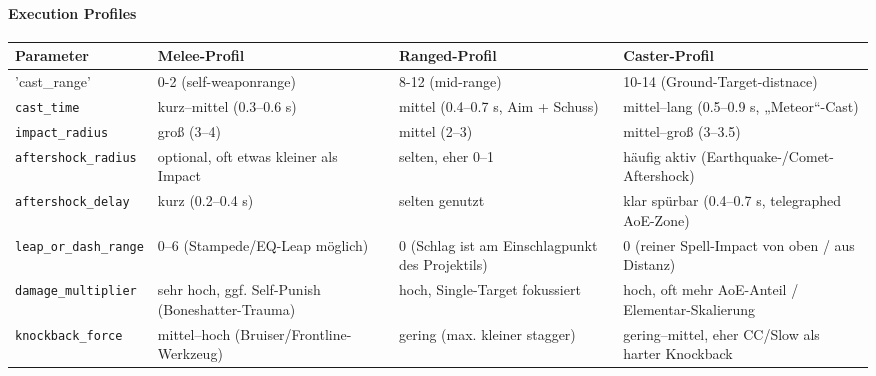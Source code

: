 \paragraph{Execution Profiles}{}
\scriptsize %
\begin{tabular}{p{3cm} | p{4cm} | p{4cm} | p{4cm}}
	Parameter           & Melee-Profil                                             & Ranged-Profil                                              & Caster-Profil                                                    \\
	\hline
	'cast\_range'        & 0-2 (self-weaponrange)                                   & 8-12 (mid-range)                                 & 10-14 (Ground-Target-distnace)  \\
	\texttt{cast\_time}         & kurz–mittel (0.3–0.6 s)                                  & mittel (0.4–0.7 s, Aim + Schuss)                          & mittel–lang (0.5–0.9 s, „Meteor“-Cast)                           \\
	\texttt{impact\_radius}     & groß (3–4)                                               & mittel (2–3)                                               & mittel–groß (3–3.5)                                              \\
	\texttt{aftershock\_radius} & optional, oft etwas kleiner als Impact                   & selten, eher 0–1                                           & häufig aktiv (Earthquake-/Comet-Aftershock)                      \\
	\texttt{aftershock\_delay}  & kurz (0.2–0.4 s)                                        & selten genutzt                                             & klar spürbar (0.4–0.7 s, telegraphed AoE-Zone)                   \\
	\texttt{leap\_or\_dash\_range} & 0–6 (Stampede/EQ-Leap möglich)                           & 0 (Schlag ist am Einschlagpunkt des Projektils)            & 0 (reiner Spell-Impact von oben / aus Distanz)                   \\
	\texttt{damage\_multiplier} & sehr hoch, ggf. Self-Punish (Boneshatter-Trauma)         & hoch, Single-Target fokussiert                             & hoch, oft mehr AoE-Anteil / Elementar-Skalierung                 \\
	\texttt{knockback\_force}   & mittel–hoch (Bruiser/Frontline-Werkzeug)                 & gering (max. kleiner stagger)                             & gering–mittel, eher CC/Slow als harter Knockback                \\
	\hline
\end{tabular}
\normalsize
